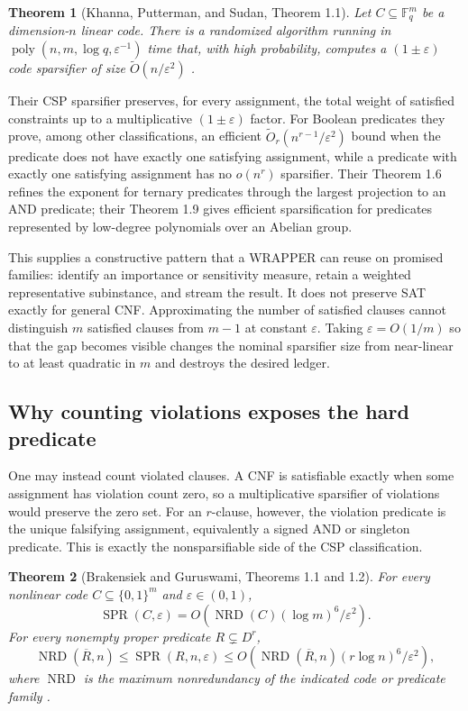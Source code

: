 \documentclass[11pt]{article}
\newtheorem{theorem}{Theorem}
\newcommand{\poly}{\operatorname{poly}}
\begin{document}
\begin{theorem}[Khanna, Putterman, and Sudan, Theorem 1.1]
Let $C\subseteq\mathbb F_q^m$ be a dimension-$n$ linear code.  There is a
randomized algorithm running in
$\poly(n,m,\log q,\varepsilon^{-1})$ time that, with high probability,
computes a $(1\pm\varepsilon)$ code sparsifier of size
$\widetilde O(n/\varepsilon^2)$
\cite{khannaputtermansudan2024}.
\end{theorem}

Their CSP sparsifier preserves, for every assignment, the total weight of
satisfied constraints up to a multiplicative $(1\pm\varepsilon)$ factor.
For Boolean predicates they prove, among other classifications, an
efficient $\widetilde O_r(n^{r-1}/\varepsilon^2)$ bound when the predicate
does not have exactly one satisfying assignment, while a predicate with
exactly one satisfying assignment has no $o(n^r)$ sparsifier.  Their
Theorem 1.6 refines the exponent for ternary predicates through the largest
projection to an AND predicate; their Theorem 1.9 gives efficient
sparsification for predicates represented by low-degree polynomials over an
Abelian group.

This supplies a constructive pattern that a WRAPPER can reuse on promised
families: identify an importance or sensitivity measure, retain a weighted
representative subinstance, and stream the result.  It does not preserve
SAT exactly for general CNF.  Approximating the number of satisfied clauses
cannot distinguish $m$ satisfied clauses from $m-1$ at constant
$\varepsilon$.  Taking $\varepsilon=O(1/m)$ so that the gap becomes visible
changes the nominal sparsifier size from near-linear to at least quadratic
in $m$ and destroys the desired ledger.

\subsection{Why counting violations exposes the hard predicate}

One may instead count violated clauses.  A CNF is satisfiable exactly when
some assignment has violation count zero, so a multiplicative sparsifier of
violations would preserve the zero set.  For an $r$-clause, however, the
violation predicate is the unique falsifying assignment, equivalently a
signed AND or singleton predicate.  This is exactly the nonsparsifiable side
of the CSP classification.

\begin{theorem}[Brakensiek and Guruswami, Theorems 1.1 and 1.2]
For every nonlinear code $C\subseteq\{0,1\}^m$ and
$\varepsilon\in(0,1)$,
\[
 \operatorname{SPR}(C,\varepsilon)
   =O\!\left(\operatorname{NRD}(C)(\log m)^6/\varepsilon^2\right).
\]
For every nonempty proper predicate $R\subsetneq D^r$,
\[
 \operatorname{NRD}(\overline R,n)
 \le \operatorname{SPR}(R,n,\varepsilon)
 \le O\!\left(\operatorname{NRD}(\overline R,n)
                 (r\log n)^6/\varepsilon^2\right),
\]
where $\operatorname{NRD}$ is the maximum nonredundancy of the indicated
code or predicate family \cite{brakensiekguruswami2026}.
\end{theorem}
\end{document}
